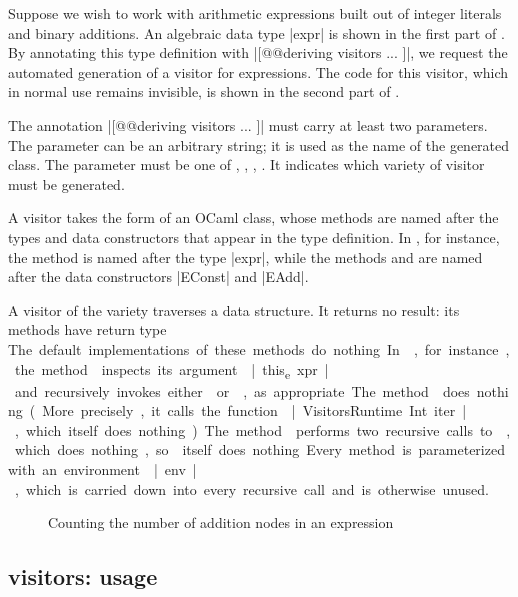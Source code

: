 \documentclass[onecolumn,11pt,nocopyrightspace]{sigplanconf}
\begin{document}
Suppose we wish to work with arithmetic expressions built out of integer
literals and binary additions. An algebraic data type \oc|expr| is shown in
the first part of . By annotating this type definition with
\oc|[@@deriving visitors { ... }]|, we request the automated generation of
a visitor for expressions. The code for this visitor, which in normal use
remains invisible, is shown in the second part of .

The annotation \oc|[@@deriving visitors { ... }]| must carry at least two
parameters. The parameter \name can be an arbitrary string; it is used as the
name of the generated class. The parameter \variety must be one of \iter,
\map, \itertwo, \maptwo. It indicates which variety of visitor must be
generated.

A visitor takes the form of an OCaml class, whose methods are named after the
types and data constructors that appear in the type definition. In
, for instance, the method  is named after
the type \oc|expr|, while the methods  and
 are named after the data constructors \oc|EConst| and
\oc|EAdd|.

A visitor of the \iter variety traverses a data structure. It returns no
result: its methods have return type \unit. The default implementations of
these methods do nothing. In , for instance, the method
 inspects its argument \oc|this_expr| and recursively
invokes either  or , as
appropriate. The method  does nothing. (More precisely,
it calls the function \oc|VisitorsRuntime.Int.iter|, which itself does
nothing.) The method  performs two recursive calls to
, which does nothing, so  itself does
nothing.

Every method is parameterized with an environment \oc|env|, which is carried
down into every recursive call and is otherwise unused.


\begin{figure}[t]
\caption{Counting the number of addition nodes in an expression}
\label{fig:expr04}
\end{figure}

\subsection{\iter visitors: usage}
\label{sec:intro:iter:usage}
\end{document}
